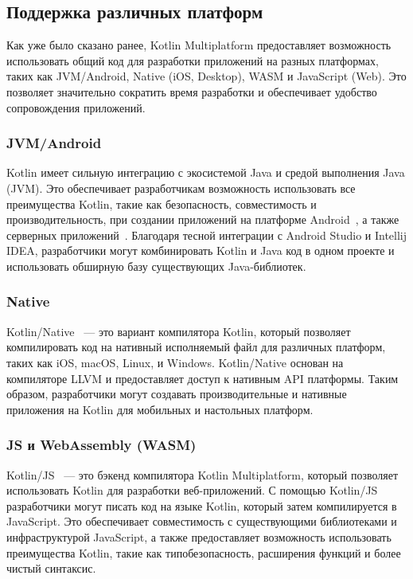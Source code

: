 \documentclass[14pt, russian]{scrartcl}
\begin{document}
\subsection{Поддержка различных платформ}

Как уже было сказано ранее, Kotlin Multiplatform предоставляет возможность использовать общий код для разработки приложений на разных платформах, таких как JVM/Android, Native (iOS, Desktop), WASM и JavaScript (Web). Это позволяет значительно сократить время разработки и обеспечивает удобство сопровождения приложений.

\subsubsection{JVM/Android}

Kotlin имеет сильную интеграцию с экосистемой Java и средой выполнения Java (JVM). Это обеспечивает разработчикам возможность использовать все преимущества Kotlin, такие как безопасность, совместимость и производительность, при создании приложений на платформе Android~\cite{KotlinAndroid}, а также серверных приложений~\cite{KotlinServer}. Благодаря тесной интеграции с Android Studio и Intellij IDEA, разработчики могут комбинировать Kotlin и Java код в одном проекте и использовать обширную базу существующих Java-библиотек.

\subsubsection{Native}

Kotlin/Native~\cite{KotlinNative} --- это вариант компилятора Kotlin, который позволяет компилировать код на нативный исполняемый файл для различных платформ, таких как iOS, macOS, Linux, и Windows. Kotlin/Native основан на компиляторе LLVM и предоставляет доступ к нативным API платформы. Таким образом, разработчики могут создавать производительные и нативные приложения на Kotlin для мобильных и настольных платформ.

\subsubsection{JS и WebAssembly (WASM)} %

Kotlin/JS~\cite{KotlinJS} --- это бэкенд компилятора Kotlin Multiplatform, который позволяет использовать Kotlin для разработки веб-приложений. С помощью Kotlin/JS разработчики могут писать код на языке Kotlin, который затем компилируется в JavaScript. Это обеспечивает совместимость с существующими библиотеками и инфраструктурой JavaScript, а также предоставляет возможность использовать преимущества Kotlin, такие как типобезопасность, расширения функций и более чистый синтаксис.
\end{document}
